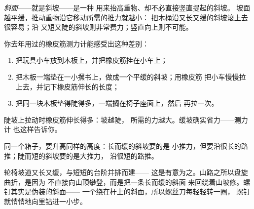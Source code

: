 \begin{definition}[斜面]\label{def:g5:simple-machines:ramp}
\emph{斜面}——就是斜坡——是一种
用来抬高重物、却不必直接竖直提起的斜坡。
坡面越平缓，推动重物沿它移动所需的推力就越小：
把木桶沿又长又缓的斜坡滚上去很容易；沿
又短又陡的斜坡则非常费力；竖直向上则不可能。
\end{definition}

\begin{method}[用橡皮筋测力计来感受]\label{met:g5:simple-machines:measure}
你去年用过的橡皮筋测力计能感受出这种差别：
\begin{enumerate}
  \item 把玩具小车放到木板上，并把橡皮筋挂在小车上；
  \item 把木板一端垫在一小摞书上，做成一个平缓的斜坡；用橡皮筋
        把小车慢慢拉上去，并记下橡皮筋伸长的长度；
  \item 把同一块木板垫得陡得多，一端搁在椅子座面上，然后
        再拉一次。
\end{enumerate}
陡坡上拉动时橡皮筋伸长得多：坡越陡，
所需的力越大。缓坡确实省力——测力计
也这样告诉你。
\end{method}

\begin{omfigure}

{\small 同一个箱子，要升高同样的高度：长而缓的斜坡要的是
小推力，但要沿很长的路推；陡而短的斜坡要的是大推力，
沿很短的路推。}
\end{omfigure}

\begin{example}[地形中的斜坡]\label{ex:g5:simple-machines:ramps}
轮椅坡道又长又缓，与短短的台阶并排而建——
这是有意为之。山路之所以盘旋曲折，是因为
不直接向山顶攀登，而是把一条长而缓的斜面
来回绕着山坡修。螺钉其实是伪装的斜面——
一个绕在杆上的斜面，所以螺丝刀每轻轻转一圈，
螺钉就悄悄地向里钻进一小步。
\end{example}

